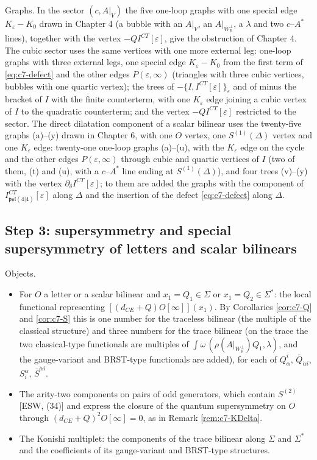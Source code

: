 Graphs. In the sector $(c,A|_V)$ the five one-loop graphs with one special edge $K_\varepsilon-K_0$ drawn in Chapter 4 (a bubble with an $A|_V$, an $A|_{W_{\mathbb R}^\perp}$, a $\lambda$ and two $c$--$A^*$ lines), together with the vertex $-QI^{CT}[\varepsilon]$, give the obstruction of Chapter 4. The cubic sector uses the same vertices with one more external leg: one-loop graphs with three external legs, one special edge $K_\varepsilon-K_0$ from the first term of \eqref{eq:c7-defect} and the other edges $P(\varepsilon,\infty)$ (triangles with three cubic vertices, bubbles with one quartic vertex); the trees of $-\{I,I^{CT}[\varepsilon]\}_\varepsilon$ and of minus the bracket of $I$ with the finite counterterm, with one $K_\varepsilon$ edge joining a cubic vertex of $I$ to the quadratic counterterm; and the vertex $-QI^{CT}[\varepsilon]$ restricted to the sector. The direct dilatation component of a scalar bilinear uses the twenty-five graphs (a)--(y) drawn in Chapter 6, with one $O$ vertex, one $S^{(1)}(\Delta)$ vertex and one $K_\varepsilon$ edge: twenty-one one-loop graphs (a)--(u), with the $K_\varepsilon$ edge on the cycle and the other edges $P(\varepsilon,\infty)$ through cubic and quartic vertices of $I$ (two of them, (t) and (u), with a $c$--$A^*$ line ending at $S^{(1)}(\Delta)$), and four trees (v)--(y) with the vertex $\partial_\delta I^{CT}[\varepsilon]$; to them are added the graphs with the component of $I^{CT}_{\mathfrak{psl}(4|4)}[\varepsilon]$ along $\Delta$ and the insertion of the defect \eqref{eq:c7-defect} along $\Delta$.



\subsection{Step 3: supersymmetry and special supersymmetry of letters and scalar bilinears}

Objects.
\begin{itemize}
\item For $O$ a letter or a scalar bilinear and $x_1=Q_1\in\Sigma$ or $x_1=Q_2\in\Sigma^*$: the local functional representing $[(d_{CE}+Q)O[\infty]](x_1)$. By Corollaries \ref{cor:c7-Q} and \ref{cor:c7-S} this is one number for the traceless bilinear (the multiple of the classical structure) and three numbers for the trace bilinear (on the trace the two classical-type functionals are multiples of $\int\omega\,(\rho(A|_{W_{\mathbb R}^\perp})Q_1,\lambda)$, and the gauge-variant and BRST-type functionals are added), for each of $Q^i_\alpha$, $\bar Q_{\dot\alpha i}$, $S^\alpha_i$, $\bar S^{\dot\alpha i}$.
\item The arity-two components on pairs of odd generators, which contain $S^{(2)}$ [ESW, (34)] and express the closure of the quantum supersymmetry on $O$ through $(d_{CE}+Q)^2O[\infty]=0$, as in Remark \ref{rem:c7-KDelta}.
\item The Konishi multiplet: the components of the trace bilinear along $\Sigma$ and $\Sigma^*$ and the coefficients of its gauge-variant and BRST-type structures.
\end{itemize}

